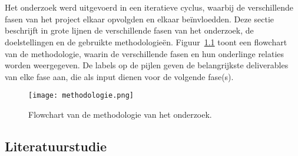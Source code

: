 
\chapter{}%
\label{ch:methodologie}


Het onderzoek werd uitgevoerd in een iteratieve cyclus, waarbij de verschillende fasen van het project elkaar opvolgden en elkaar beïnvloedden.
Deze sectie beschrijft in grote lijnen de verschillende fasen van het onderzoek, de doelstellingen en de gebruikte methodologieën.
Figuur~\ref{fig:methodologie} toont een flowchart van de methodologie, waarin de verschillende fasen en hun onderlinge relaties worden weergegeven.
De labels op de pijlen geven de belangrijkste deliverables van elke fase aan, die als input dienen voor de volgende fase(s).
\begin{figure}[H]
  \centering
  \texttt{[image: methodologie.png]}
  \caption{Flowchart van de methodologie van het onderzoek.}
  \label{fig:methodologie}
\end{figure}

\section{Literatuurstudie}

